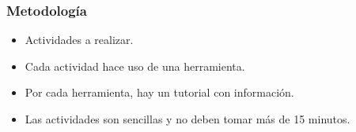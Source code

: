 \begin{frame}
\frametitle{Metodología}
\begin{itemize}
    \item Actividades a realizar.
	\item Cada actividad hace uso de una herramienta.
	\item Por cada herramienta, hay un tutorial con información.
	\item Las actividades son sencillas y no deben tomar más de 15 minutos.
\end{itemize}
\end{frame}

